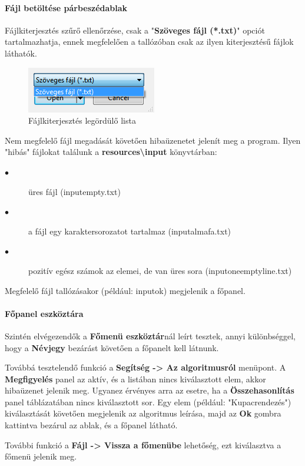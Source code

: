 \documentclass{elteikthesis}
\begin{document}
\paragraph{Fájl betöltése párbeszédablak}
Fájlkiterjesztés szűrő ellenőrzése, csak a "\textbf{Szöveges fájl (*.txt)}" opciót tartalmazhatja, ennek megfelelően a tallózóban csak az ilyen kiterjesztésű fájlok láthatók.
\begin{figure}[H]
	\centering
	\includegraphics{pics/test/fileextension.png}
	\caption{Fájlkiterjesztés legördülő lista}
\end{figure}
Nem megfelelő fájl megadását követően hibaüzenetet jelenít meg a program. Ilyen "hibás" fájlokat találunk a \textbf{resources\textbackslash input} könyvtárban:
\begin{description}
	\item[$\bullet$] üres fájl (input\textunderscore empty.txt)
	\item[$\bullet$] a fájl egy karaktersorozatot tartalmaz (input\textunderscore almafa.txt)
	\item[$\bullet$] pozitív egész számok az elemei, de van üres sora (input\textunderscore oneemptyline.txt)
\end{description}\par
Megfelelő fájl tallózásakor (például: input\textunderscore ok) megjelenik a főpanel.
\paragraph{Főpanel eszköztára}
Szintén elvégezendők a \textbf{Főmenü eszköztár}nál leírt tesztek, annyi különbséggel, hogy a \textbf{Névjegy} bezárást követően a főpanelt kell látnunk.\par
Továbbá tesztelendő funkció a \textbf{Segítség -> Az algoritmusról} menüpont. A \textbf{Megfigyelés} panel az aktív, és a listában nincs kiválasztott elem, akkor hibaüzenet jelenik meg. Ugyanez érvényes arra az esetre, ha a \textbf{Összehasonlítás} panel táblázatában nincs kiválasztott sor. Egy elem (például: "Kupacrendezés") kiválasztását követően megjelenik az algoritmus leírása, majd az \textbf{Ok} gombra kattintva bezárul az ablak, és a főpanel látható.\par
További funkció a \textbf{Fájl -> Vissza a főmenübe} lehetőség, ezt kiválasztva a főmenü jelenik meg.
\end{document}
